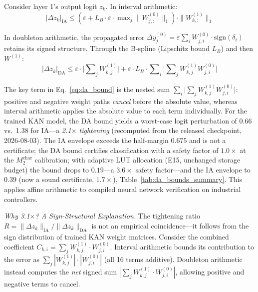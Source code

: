 \documentclass[journal,onecolumn]{IEEEtran}
\begin{document}
Consider layer 1's output logit $z_k$. In interval arithmetic:
\begin{equation}
|\Delta z_k|_{\text{IA}} \leq (\varepsilon + L_B \cdot \varepsilon \cdot
\max\nolimits_j\|W^{(0)}_{j,:}\|_1) \cdot \|W^{(1)}_{k,:}\|_1
\end{equation}

In doubleton arithmetic, the propagated error $\Delta y^{(0)}_j =
\varepsilon \sum_i W^{(0)}_{j,i} \cdot \text{sign}(\delta_i)$ retains
its signed structure. Through the B-spline (Lipschitz bound $L_B$) and
then $W^{(1)}$:
\begin{equation}
|\Delta z_k|_{\text{DA}} \leq \varepsilon \cdot \bigl|\sum\nolimits_j
W^{(1)}_{k,j}\bigr| + \varepsilon \cdot L_B \cdot \sum\nolimits_i
\bigl|\sum\nolimits_j W^{(1)}_{k,j} W^{(0)}_{j,i}\bigr|
\label{eq:da_bound}
\end{equation}

The key term in Eq.~\eqref{eq:da_bound} is the nested sum
$\sum_i \bigl|\sum_j W^{(1)}_{k,j} W^{(0)}_{j,i}\bigr|$: positive
and negative weight paths \textit{cancel} before the absolute value,
whereas interval arithmetic applies the absolute value to each term
individually. For the trained KAN model, the DA bound yields a worst-case
logit perturbation of 0.66 vs.\ 1.38 for IA---a
\textit{2.1$\times$ tightening} (recomputed from the released checkpoint,
2026-08-03). The IA envelope exceeds the half-margin $0.675$ and is not
a certificate; the DA bound certifies classification with a safety
factor of $1.0\times$ at the $M_2^{\text{char}}$ calibration; with
adaptive LUT allocation (E15, unchanged storage budget) the bound drops
to $0.19$---a $3.6\times$ safety factor---and the IA envelope to $0.39$
(now a sound certificate, $1.7\times$), Table~\ref{tab:da_bounds_summary}.
This applies affine arithmetic to
compiled neural network verification on industrial controllers.

\vspace{4pt}
\noindent\textit{Why 3.1$\times$? A Sign-Structural Explanation.}
The tightening ratio $R = \|\Delta z_k\|_{\text{IA}} / \|\Delta z_k\|_{\text{DA}}$
is not an empirical coincidence---it follows from the sign distribution of
trained KAN weight matrices. Consider the combined coefficient
$C_{k,i} = \sum_j W^{(1)}_{k,j} \cdot W^{(0)}_{j,i}$. Interval arithmetic
bounds its contribution to the error as $\sum_j |W^{(1)}_{k,j}| \cdot
|W^{(0)}_{j,i}|$ (all 16 terms additive). Doubleton arithmetic instead
computes the \textit{net} signed sum $|\sum_j W^{(1)}_{k,j} \cdot
W^{(0)}_{j,i}|$, allowing positive and negative terms to cancel.
\end{document}

